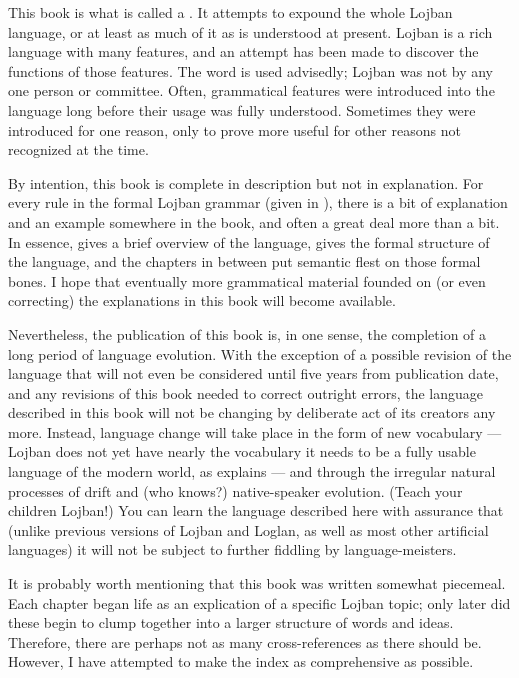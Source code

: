 This book is what is called a . It attempts to expound the whole Lojban language, or at least as much of it as is understood at present. Lojban is a rich language with many features, and an attempt has been made to discover the functions of those features. The word  is used advisedly; Lojban was not  by any one person or committee. Often, grammatical features were introduced into the language long before their usage was fully understood. Sometimes they were introduced for one reason, only to prove more useful for other reasons not recognized at the time.

By intention, this book is complete in description but not in explanation. For every rule in the formal Lojban grammar (given in ), there is a bit of explanation and an example somewhere in the book, and often a great deal more than a bit. In essence,  gives a brief overview of the language,  gives the formal structure of the language, and the chapters in between put semantic flest on those formal bones. I hope that eventually more grammatical material founded on (or even correcting) the explanations in this book will become available.

Nevertheless, the publication of this book is, in one sense, the completion of a long period of language evolution. With the exception of a possible revision of the language that will not even be considered until five years from publication date, and any revisions of this book needed to correct outright errors, the language described in this book will not be changing by deliberate act of its creators any more. Instead, language change will take place in the form of new vocabulary --- Lojban does not yet have nearly the vocabulary it needs to be a fully usable language of the modern world, as  explains --- and through the irregular natural processes of drift and (who knows?) native-speaker evolution. (Teach your children Lojban!) You can learn the language described here with assurance that (unlike previous versions of Lojban and Loglan, as well as most other artificial languages) it will not be subject to further fiddling by language-meisters.

It is probably worth mentioning that this book was written somewhat piecemeal. Each chapter began life as an explication of a specific Lojban topic; only later did these begin to clump together into a larger structure of words and ideas. Therefore, there are perhaps not as many cross-references as there should be. However, I have attempted to make the index as comprehensive as possible.


